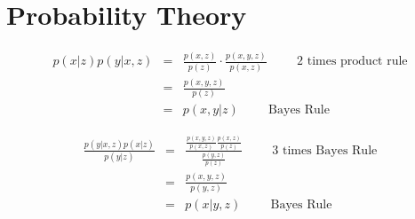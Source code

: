 \section{Probability Theory}

\begin{eqnarray} 
    p(x|z)p(y|x,z) &=&  \frac{p(x,z)}{p(z)}\cdot \frac{p(x,y,z)}{p(x,z)} \hspace{1cm}\mbox{2 times product rule}\\
    &=&  \frac{p(x,y,z)}{p(z)} \\
    &=&  p(x,y|z) \hspace{1cm} \mbox{Bayes Rule}
\end{eqnarray}

\begin{eqnarray}
    \frac{p(y| x,z)p(x|z)}{p(y|z)}&=& \frac{\frac{p(x,y,z)}{p(x,z)} \frac{p(x,z)}{p(z)}}{\frac{p(y,z)}{p(z)}} \hspace{1cm}\mbox{3 times Bayes Rule}\\
    &=& \frac{p(x,y,z)}{p(y,z)} \\
    &=& p(x|y,z) \hspace{1cm}\mbox{Bayes Rule}
\end{eqnarray}


